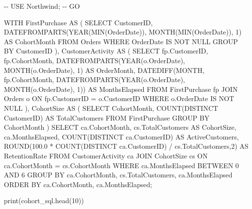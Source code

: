 \documentclass[
  letterpaper,
  DIV=11,
  numbers=noendperiod]{scrartcl}
\newenvironment{Shaded}{\begin{snugshade}}{\end{snugshade}}
\newcommand{\BuiltInTok}[1]{\textcolor[rgb]{0.00,0.23,0.31}{#1}}
\newcommand{\DecValTok}[1]{\textcolor[rgb]{0.68,0.00,0.00}{#1}}
\newcommand{\FloatTok}[1]{\textcolor[rgb]{0.68,0.00,0.00}{#1}}
\newcommand{\NormalTok}[1]{\textcolor[rgb]{0.00,0.23,0.31}{#1}}
\newcommand{\OperatorTok}[1]{\textcolor[rgb]{0.37,0.37,0.37}{#1}}
\begin{document}
\begin{Shaded}
\begin{Highlighting}[]
\OperatorTok{{-}{-}}\NormalTok{ USE Northwind}\OperatorTok{;}
\OperatorTok{{-}{-}}\NormalTok{ GO}

\NormalTok{WITH FirstPurchase AS (}
\NormalTok{    SELECT}
\NormalTok{        CustomerID,}
\NormalTok{        DATEFROMPARTS(YEAR(MIN(OrderDate)), MONTH(MIN(OrderDate)), }\DecValTok{1}\NormalTok{) AS CohortMonth}
\NormalTok{    FROM Orders}
\NormalTok{    WHERE OrderDate IS NOT NULL}
\NormalTok{    GROUP BY CustomerID}
\NormalTok{),}
\NormalTok{CustomerActivity AS (}
\NormalTok{    SELECT}
\NormalTok{        fp.CustomerID,}
\NormalTok{        fp.CohortMonth,}
\NormalTok{        DATEFROMPARTS(YEAR(o.OrderDate), MONTH(o.OrderDate), }\DecValTok{1}\NormalTok{) AS OrderMonth,}
\NormalTok{        DATEDIFF(MONTH, fp.CohortMonth,}
\NormalTok{            DATEFROMPARTS(YEAR(o.OrderDate), MONTH(o.OrderDate), }\DecValTok{1}\NormalTok{)) AS MonthsElapsed}
\NormalTok{    FROM FirstPurchase fp}
\NormalTok{    JOIN Orders o ON fp.CustomerID }\OperatorTok{=}\NormalTok{ o.CustomerID}
\NormalTok{    WHERE o.OrderDate IS NOT NULL}
\NormalTok{),}
\NormalTok{CohortSize AS (}
\NormalTok{    SELECT CohortMonth, COUNT(DISTINCT CustomerID) AS TotalCustomers}
\NormalTok{    FROM FirstPurchase}
\NormalTok{    GROUP BY CohortMonth}
\NormalTok{)}
\NormalTok{SELECT}
\NormalTok{    ca.CohortMonth,}
\NormalTok{    cs.TotalCustomers                                           AS CohortSize,}
\NormalTok{    ca.MonthsElapsed,}
\NormalTok{    COUNT(DISTINCT ca.CustomerID)                              AS ActiveCustomers,}
\NormalTok{    ROUND(}\FloatTok{100.0} \OperatorTok{*}\NormalTok{ COUNT(DISTINCT ca.CustomerID)}
        \OperatorTok{/}\NormalTok{ cs.TotalCustomers,}\DecValTok{2}\NormalTok{)                               AS RetentionRate}
\NormalTok{FROM CustomerActivity ca}
\NormalTok{JOIN CohortSize cs ON ca.CohortMonth }\OperatorTok{=}\NormalTok{ cs.CohortMonth}
\NormalTok{WHERE ca.MonthsElapsed BETWEEN }\DecValTok{0}\NormalTok{ AND }\DecValTok{6}
\NormalTok{GROUP BY ca.CohortMonth, cs.TotalCustomers, ca.MonthsElapsed}
\NormalTok{ORDER BY ca.CohortMonth, ca.MonthsElapsed}\OperatorTok{;}
\end{Highlighting}
\end{Shaded}

\begin{Shaded}
\begin{Highlighting}[]
\BuiltInTok{print}\NormalTok{(cohort\_sql.head(}\DecValTok{10}\NormalTok{))}
\end{Highlighting}
\end{Shaded}
\end{document}
